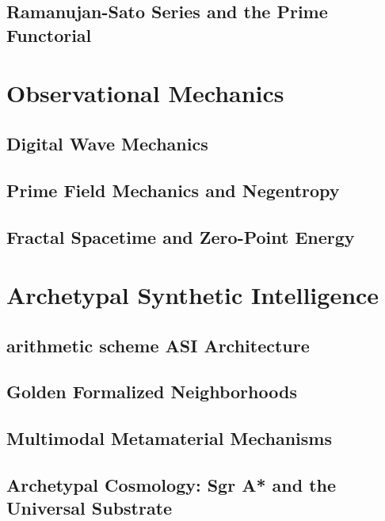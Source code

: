\documentclass[12pt,oneside]{book}
\theoremstyle{principia}
\theoremstyle{definition}
\theoremstyle{remark}
\begin{document}
\chapter[Ramanujan-Sato Series and the Prime Functorial]{Ramanujan-Sato Series and the Prime Functorial}


\part{Observational Mechanics}
\chapter[Wave Mechanics]{Digital Wave Mechanics}


\chapter[Prime Field Mechanics]{Prime Field Mechanics and Negentropy}\label{ch:pft}


\chapter[Fractal Spacetime]{Fractal Spacetime and Zero-Point Energy}



\part{Archetypal Synthetic Intelligence}
\chapter[arithmetic scheme ASI]{arithmetic scheme ASI Architecture}


\chapter[Golden Neighborhoods]{Golden Formalized Neighborhoods}


\chapter[Multimodal Mechanisms]{Multimodal Metamaterial Mechanisms}


\chapter[Archetypal Cosmology]{Archetypal Cosmology: Sgr A* and the Universal Substrate}

\end{document}
